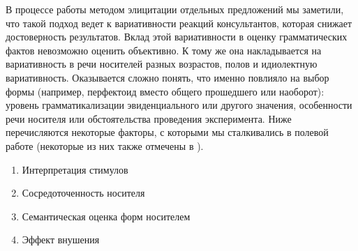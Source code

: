 \par В процессе работы методом элицитации отдельных предложений мы заметили, что такой подход ведет к вариативности реакций консультантов, которая снижает достоверность результатов. Вклад этой вариативности в оценку грамматических фактов невозможно оценить объективно. К тому же она накладывается на вариативность в речи носителей разных возрастов, полов и идиолектную вариативность. Оказывается сложно понять, что именно повлияло на выбор формы (например, перфектоид вместо общего прошедшего или наоборот): уровень грамматикализации эвиденциального или другого значения, особенности речи носителя или обстоятельства проведения эксперимента. Ниже перечисляются некоторые факторы, с которыми мы сталкивались в полевой работе (некоторые из них также отмечены в \citep{kibrik1972}).

\begin{enumerate}
    \item Интерпретация стимулов
    \item Сосредоточенность носителя
    \item Семантическая оценка форм носителем
    \item Эффект внушения
\end{enumerate}

